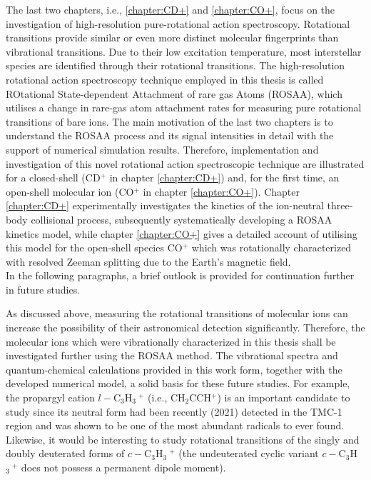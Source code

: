 The last two chapters, i.e., \ref{chapter:CD+} and \ref{chapter:CO+}, focus on the investigation of high-resolution 
pure-rotational action spectroscopy. Rotational transitions provide similar or even more distinct molecular 
fingerprints than vibrational transitions. Due to their low excitation temperature, most interstellar species are 
identified through their rotational transitions. The high-resolution rotational action spectroscopy technique employed 
in this thesis is called ROtational State-dependent Attachment of rare gas Atoms (ROSAA), which utilises a change in 
rare-gas atom attachment rates for measuring pure rotational transitions of bare ions. The main motivation of the last 
two chapters is to understand the ROSAA process and its signal intensities in detail with the support of numerical 
simulation results. Therefore, implementation and investigation of this novel rotational action spectroscopic technique 
are illustrated for a closed-shell (CD$^+$ in chapter \ref{chapter:CD+}) and, for the first time, an open-shell 
molecular ion (CO$^+$ in chapter \ref{chapter:CO+}). Chapter \ref{chapter:CD+} experimentally investigates the kinetics 
of the ion-neutral three-body collisional process, subsequently systematically developing a ROSAA kinetics model, while 
chapter \ref{chapter:CO+} gives a detailed account of utilising this model for the open-shell species CO$^+$ which was 
rotationally characterized with resolved Zeeman splitting due to the Earth's magnetic field.\\


In the following paragraphs, a brief outlook is provided for continuation further in future studies.

As discussed above, measuring the rotational transitions of molecular ions can increase the possibility of their astronomical detection significantly. Therefore, the molecular ions which were vibrationally characterized in this thesis shall be investigated further using the ROSAA method. The vibrational spectra and quantum-chemical calculations provided in this work form, together with the developed numerical model, a solid basis for these future studies. For example, the propargyl cation $l-$C$_3$H$_3\ ^+$ (i.e., CH$_2$CCH$^+$) is an important candidate to study since its neutral form had been recently (2021) detected in the TMC-1 region and was shown to be one of the most abundant radicals to ever found. Likewise, it would be interesting to study rotational transitions of the singly and doubly deuterated forms of $c-$C$_3$H$_3\ ^+$ (the undeuterated cyclic variant $c-$C$_3$H$_3\ ^+$ does not possess a permanent dipole moment).

